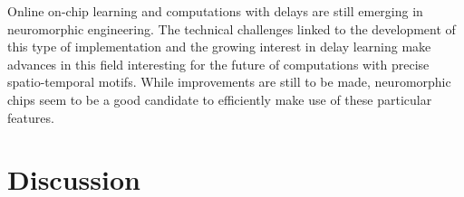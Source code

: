 \documentclass[brainsci, %
               review,accept,pdftex,moreauthors
               ]{Definitions/mdpi}
\begin{document}
Online on-chip learning and computations with delays are still emerging in neuromorphic engineering. The technical challenges linked to the development of this type of implementation and the growing interest in delay learning make advances in this field interesting for the future of computations with precise spatio-temporal motifs. While improvements are still to be made, neuromorphic chips seem to be a good candidate to efficiently make use of these particular features. 



%
%
%
%
%
%
\section{Discussion}\label{sec:discussion}
\end{document}
